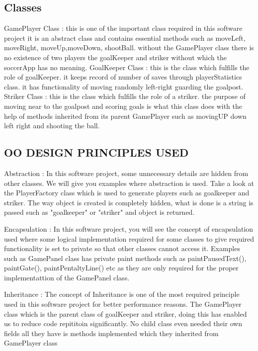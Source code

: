 \documentclass[12pt, dvipsnames, a4paper]{article}
\begin{document}
\subsection{Classes}
GamePlayer Class : this is one of the important class required in this software project it is an abstract class 
and contains  essential methods such as moveLeft, moveRight, moveUp,moveDown, shootBall. without the GamePlayer
class there is no existence of two players the goalKeeper and striker without which the soccerApp has no meaning.
GoalKeeper Class :  this is the class which fulfills the role of goalKeeper. it keeps record of number of saves through
playerStatistics class. it has functionality of moving randomly left-right guarding the goalpost.
Striker Class : this is the class which fulfills the role of a striker. the purpose of moving near to the goalpost
and scoring goals is what this class does with the help of methods inherited from its parent GamePlayer such as 
movingUP down left right and shooting the ball.
\clearpage

\subsection{ OO DESIGN PRINCIPLES USED}
Abstraction : In this software project, some unnecessary details are hidden from other classes. We will give you examples
where abstraction is used. Take a look at the PlayerFactory class which is used to generate players such as goalkeeper
and striker. The way object is created is completely hidden, what is done is a string is passed such as "goalkeeper" or 
"striker" and object is returned.

Encapsulation : In this software project, you will see the concept of encapsulation used where some logical implementation
required for some classes to give required functionality is set to private so that other classes cannot access it. 
Examples such as GamePanel class has private paint methods such as paintPausedText(), paintGate(), paintPentaltyLine() etc
as they are only required for the proper implementattion of the GamePanel class.

Inheritance : The concept of Inheritance is one of the most required principle used in this software project for better performance reasons.
The GamePlayer class which is the parent class of goalKeeper and striker, doing this has enabled us to reduce code repititoin significantly.
No child class even needed their own fields all they have is methods implemented which they inherited from GamePlayer class
\end{document}
